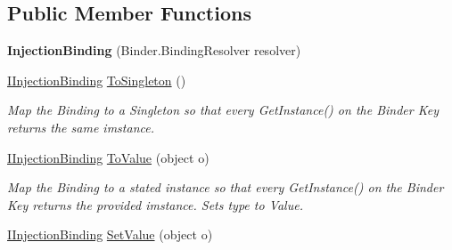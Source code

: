\subsection*{Public Member Functions}
\begin{DoxyCompactItemize}
\item 
\hypertarget{classstrange_1_1extensions_1_1injector_1_1impl_1_1_injection_binding_ac7cd5da2e7c65f4e60dddc4adeb76aa3}{{\bfseries Injection\-Binding} (Binder.\-Binding\-Resolver resolver)}\label{classstrange_1_1extensions_1_1injector_1_1impl_1_1_injection_binding_ac7cd5da2e7c65f4e60dddc4adeb76aa3}

\item 
\hypertarget{classstrange_1_1extensions_1_1injector_1_1impl_1_1_injection_binding_a0e91d1685d6518e622468bf26e55cd02}{\hyperlink{interfacestrange_1_1extensions_1_1injector_1_1api_1_1_i_injection_binding}{I\-Injection\-Binding} \hyperlink{classstrange_1_1extensions_1_1injector_1_1impl_1_1_injection_binding_a0e91d1685d6518e622468bf26e55cd02}{To\-Singleton} ()}\label{classstrange_1_1extensions_1_1injector_1_1impl_1_1_injection_binding_a0e91d1685d6518e622468bf26e55cd02}

\begin{DoxyCompactList}\small\item\em Map the Binding to a Singleton so that every {\ttfamily Get\-Instance()} on the Binder Key returns the same imstance. \end{DoxyCompactList}\item 
\hypertarget{classstrange_1_1extensions_1_1injector_1_1impl_1_1_injection_binding_a2d5492d1aec7dc4b48f5670e4eb35bde}{\hyperlink{interfacestrange_1_1extensions_1_1injector_1_1api_1_1_i_injection_binding}{I\-Injection\-Binding} \hyperlink{classstrange_1_1extensions_1_1injector_1_1impl_1_1_injection_binding_a2d5492d1aec7dc4b48f5670e4eb35bde}{To\-Value} (object o)}\label{classstrange_1_1extensions_1_1injector_1_1impl_1_1_injection_binding_a2d5492d1aec7dc4b48f5670e4eb35bde}

\begin{DoxyCompactList}\small\item\em Map the Binding to a stated instance so that every {\ttfamily Get\-Instance()} on the Binder Key returns the provided imstance. Sets type to Value. \end{DoxyCompactList}\item 
\hypertarget{classstrange_1_1extensions_1_1injector_1_1impl_1_1_injection_binding_ad97ebc39c7c92c529732ee4f36ed6684}{\hyperlink{interfacestrange_1_1extensions_1_1injector_1_1api_1_1_i_injection_binding}{I\-Injection\-Binding} \hyperlink{classstrange_1_1extensions_1_1injector_1_1impl_1_1_injection_binding_ad97ebc39c7c92c529732ee4f36ed6684}{Set\-Value} (object o)}\label{classstrange_1_1extensions_1_1injector_1_1impl_1_1_injection_binding_ad97ebc39c7c92c529732ee4f36ed6684}


\end{DoxyCompactItemize}
